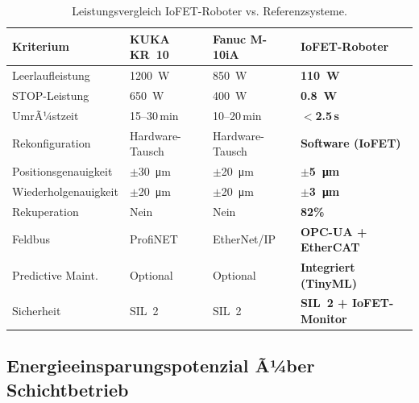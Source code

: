 ﻿\documentclass[a4paper,12pt]{scrreprt}
\theoremstyle{definition}
\begin{document}
\begin{table}[H]
\centering
\caption{Leistungsvergleich IoFET-Roboter vs. Referenzsysteme.}
\label{tab:compare}
\small
\begin{tabularx}{\linewidth}{|l|X|X|X|}
\hline
\rowcolor{iofetblue!25}
\textbf{Kriterium} & \textbf{KUKA KR~10} & \textbf{Fanuc M-10iA} & \textbf{IoFET-Roboter} \\
\hline
Leerlaufleistung & \SI{1200}{\watt} & \SI{850}{\watt} & \textbf{\SI{110}{\watt}} \\
\hline
STOP-Leistung & \SI{650}{\watt} & \SI{400}{\watt} & \textbf{\SI{0.8}{\watt}} \\
\hline
UmrÃ¼stzeit & 15--30\,min & 10--20\,min & \textbf{$<$2.5\,s} \\
\hline
Rekonfiguration & Hardware-Tausch & Hardware-Tausch & \textbf{Software (IoFET)} \\
\hline
Positionsgenauigkeit & $\pm$\SI{30}{\micro\meter} & $\pm$\SI{20}{\micro\meter} & \textbf{$\pm$\SI{5}{\micro\meter}} \\
\hline
Wiederholgenauigkeit & $\pm$\SI{20}{\micro\meter} & $\pm$\SI{20}{\micro\meter} & \textbf{$\pm$\SI{3}{\micro\meter}} \\
\hline
Rekuperation & Nein & Nein & \textbf{82\%} \\
\hline
Feldbus & ProfiNET & EtherNet/IP & \textbf{OPC-UA + EtherCAT} \\
\hline
Predictive Maint. & Optional & Optional & \textbf{Integriert (TinyML)} \\
\hline
Sicherheit & SIL~2 & SIL~2 & \textbf{SIL~2 + IoFET-Monitor} \\
\hline
\end{tabularx}
\end{table}

\subsection{Energieeinsparungspotenzial Ã¼ber Schichtbetrieb}
\end{document}
